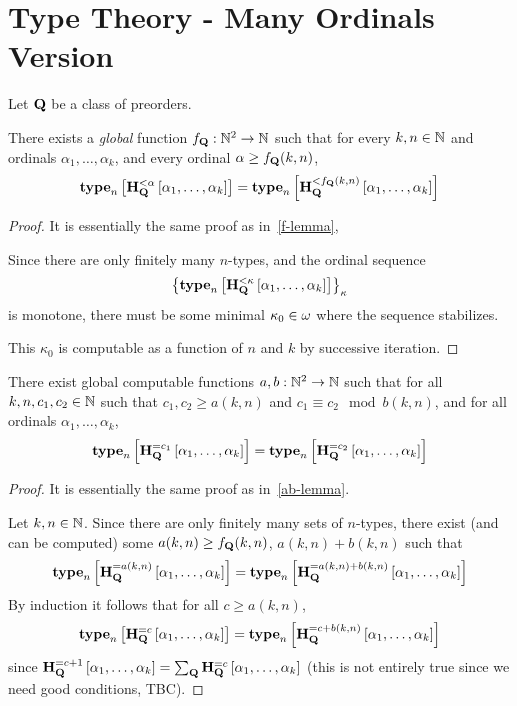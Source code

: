 \section{Type Theory - Many Ordinals Version}

\begin{lemma}\label{f-lemma-many-ordinals}
    Let $\mathbf{Q}$ be a class of preorders.

    There exists a \emph{global} function $f_{\mathbf{Q}} : \mathbb{N}^2 \to \mathbb{N}$
    such that for every $k, n \in \mathbb{N}$ and ordinals
    $\alpha_1, \ldots, \alpha_k$, and every ordinal $\alpha \ge f_{\mathbf{Q}}(k, n)$,
    \[
        \mathbf{type}_{n} \left[ {\mathbf{H}_{\mathbf{Q}}^{< \alpha} \left[ {\alpha_1, \ldots, \alpha_k} \right]} \right]
        = \mathbf{type}_{n} \left[ {\mathbf{H}_{\mathbf{Q}}^{< f_{\mathbf{Q}}(k,n)} \left[ {\alpha_1, \ldots, \alpha_k} \right]} \right]
    \]
\end{lemma}

\begin{proof}
    It is essentially the same proof as in~\cref{f-lemma},

    Since there are only finitely many $n$-types,
    and the ordinal sequence
    \[
        \left\{ {\mathbf{type}_{n} \left[ {\mathbf{H}_{\mathbf{Q}}^{< \kappa} \left[ {\alpha_1, \ldots, \alpha_k} \right]} \right]} \right\}_{\kappa}
    \]
    is monotone,
    there must be some minimal $\kappa_0 \in \omega$ where the sequence stabilizes.

    This $\kappa_0$ is computable as a function of $n$ and $k$ by successive iteration.
\end{proof}

\begin{lemma}\label{ab-lemma-many-ordinals}
    There exist global computable functions $a, b : \mathbb{N}^2 \to \mathbb{N}$ such that
    for all $k, n, c_1, c_2 \in \mathbb{N}$ such that $c_1, c_2 \ge a(k, n)$ and
    $c_1 \equiv c_2 \mod b(k, n)$,
    and for all ordinals $\alpha_1, \ldots, \alpha_k$,
    \[
        \mathbf{type}_{n} \left[ {\mathbf{H}_{\mathbf{Q}}^{= c_1} \left[ {\alpha_1, \ldots, \alpha_k} \right]} \right]
        = \mathbf{type}_{n} \left[ {\mathbf{H}_{\mathbf{Q}}^{= c_2} \left[ {\alpha_1, \ldots, \alpha_k} \right]} \right]
    \]
\end{lemma}

\begin{proof}
    It is essentially the same proof as in~\cref{ab-lemma}.

    Let $k, n \in \mathbb{N}$.
    Since there are only finitely many sets of $n$-types,
    there exist (and can be computed)
    some $a(k, n) \ge f_{\mathbf{Q}}(k, n)$, $a(k, n) + b(k, n)$ such that
    \[
        \mathbf{type}_{n} \left[ {\mathbf{H}_{\mathbf{Q}}^{= a(k, n)} \left[ {\alpha_1, \ldots, \alpha_k} \right]} \right]
        = \mathbf{type}_{n} \left[ {\mathbf{H}_{\mathbf{Q}}^{= a(k, n) + b(k, n)} \left[ {\alpha_1, \ldots, \alpha_k} \right]} \right]
    \]
    By induction it follows that for all $c \ge a(k, n)$,
    \[
        \mathbf{type}_{n} \left[ {\mathbf{H}_{\mathbf{Q}}^{= c} \left[ {\alpha_1, \ldots, \alpha_k} \right]} \right]
        = \mathbf{type}_{n} \left[ {\mathbf{H}_{\mathbf{Q}}^{= c + b(k, n)} \left[ {\alpha_1, \ldots, \alpha_k} \right]} \right]
    \]
    since $\mathbf{H}_{\mathbf{Q}}^{= c + 1} \left[ {\alpha_1, \ldots, \alpha_k} \right]
        = \sum_{\mathbf{Q}} \mathbf{H}_{\mathbf{Q}}^{= c} \left[ {\alpha_1, \ldots, \alpha_k} \right]$
    (this is not entirely true since we need good conditions, TBC).
\end{proof}

